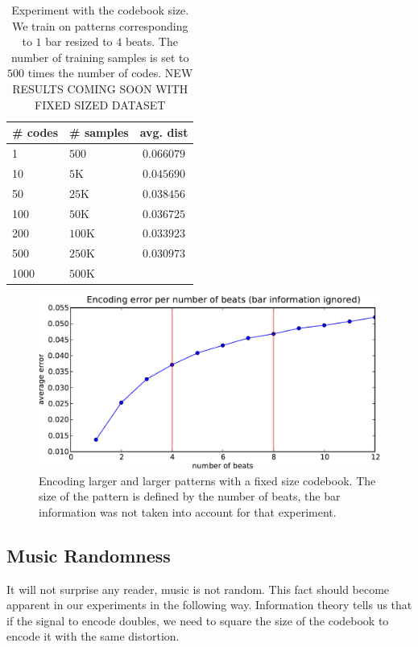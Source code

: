\documentclass{article}
\begin{document}
\begin{table}
\begin{center}
\begin{tabular}{|l|l|c|}
\hline
\# codes & \# samples & avg. dist \\ \hline \hline
1 & $500$ & $0.066079$ \\
10 & $5$K & $0.045690$ \\
50 & $25$K & $0.038456$ \\
100 & $50$K & $0.036725$ \\
200 & $100$K & $0.033923$ \\
500 & $250$K & $0.030973$ \\
1000 & $500$K & \\ \hline
\end{tabular}
\end{center}
\caption{\small{Experiment with the codebook size. We train on patterns
corresponding to $1$ bar resized to $4$ beats. The number of training
samples is set to $500$ times the number of codes. 
NEW RESULTS COMING SOON WITH FIXED SIZED DATASET }}
\label{tab:cbsize}
\end{table}


\begin{figure}[htb]
\begin{center}
\includegraphics[width=.9\columnwidth]{encoding_per_beat}
\end{center}
\caption{\small{Encoding larger and larger patterns with a fixed size
codebook. The size of the pattern is defined by the number of beats,
the bar information was not taken into account for that experiment.
}}
\label{fig:perbeat}
\end{figure}

\subsection{Music Randomness}\label{ssec:random}
It will not surprise any reader, music is not random. This fact should
become apparent in our experiments in the following way. Information
theory tells us that if the signal to encode doubles, we need to square
the size of the codebook to encode it with the same distortion.
\end{document}
